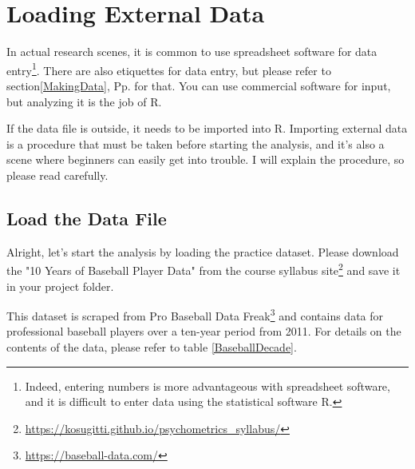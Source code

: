 \documentclass{ltjsbook}
\begin{document}
\section{Loading External Data}
In actual research scenes, it is common to use spreadsheet software for data entry\footnote{Indeed, entering numbers is more advantageous with spreadsheet software, and it is difficult to enter data using the statistical software R.}. There are also etiquettes for data entry, but please refer to section\ref{MakingData}, Pp.\pageref{MakingData} for that. You can use commercial software for input, but analyzing it is the job of R.

If the data file is outside, it needs to be imported into R. Importing external data is a procedure that must be taken before starting the analysis, and it's also a scene where beginners can easily get into trouble. I will explain the procedure, so please read carefully.

\subsection{Load the Data File}
\label{readCSV}
Alright, let's start the analysis by loading the practice dataset.
Please download the "10 Years of Baseball Player Data" from the course syllabus site\footnote{\url{https://kosugitti.github.io/psychometrics_syllabus/}} and save it in your project folder.

This dataset is scraped from Pro Baseball Data Freak\footnote{\url{https://baseball-data.com/}} and contains data for professional baseball players over a ten-year period from 2011. For details on the contents of the data, please refer to table \ref{BaseballDecade}.

\end{document}
